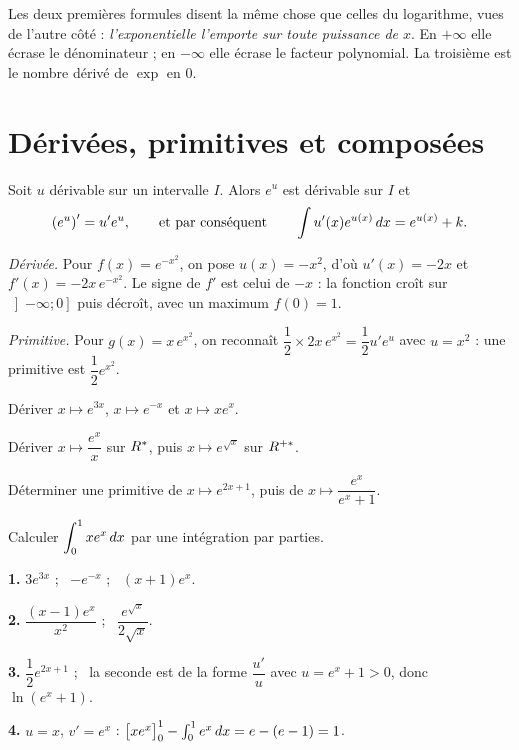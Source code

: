 \begin{remarque}
Les deux premières formules disent la même chose que celles du logarithme, vues
de l'autre côté : \emph{l'exponentielle l'emporte sur toute puissance de $x$}.
En $+\infty$ elle écrase le dénominateur ; en $-\infty$ elle écrase le facteur
polynomial. La troisième est le nombre dérivé de $\exp$ en $0$.
\end{remarque}

\section{Dérivées, primitives et composées}

\begin{theoreme}
Soit $u$ dérivable sur un intervalle $I$. Alors $e^{u}$ est dérivable sur $I$
et
\[
  \left(e^{u}\right)' = u'e^{u}, \qquad\text{et par conséquent}\qquad
  \int u'(x)e^{u(x)}\,dx = e^{u(x)} + k .
\]
\end{theoreme}

\begin{exemple}
\emph{Dérivée.} Pour $f(x) = e^{-x^{2}}$, on pose $u(x) = -x^{2}$, d'où
$u'(x) = -2x$ et $f'(x) = -2x\,e^{-x^{2}}$. Le signe de $f'$ est celui de
$-x$ : la fonction croît sur $\left]-\infty;0\right]$ puis décroît, avec un
maximum $f(0) = 1$.

\smallskip
\emph{Primitive.} Pour $g(x) = x\,e^{x^{2}}$, on reconnaît
$\dfrac{1}{2}\times 2x\,e^{x^{2}} = \dfrac{1}{2}u'e^{u}$ avec $u = x^{2}$ :
une primitive est $\dfrac{1}{2}e^{x^{2}}$.
\end{exemple}

\begin{entrainement}
\exo[\niveau{1}] Dériver $x \mapsto e^{3x}$, $x \mapsto e^{-x}$ et
$x \mapsto xe^{x}$.

\exo[\niveau{2}] Dériver $x \mapsto \dfrac{e^{x}}{x}$ sur $R^{*}$, puis
$x \mapsto e^{\sqrt{x}}$ sur $R^{+*}$.

\exo[\niveau{2}] Déterminer une primitive de $x \mapsto e^{2x+1}$, puis de
$x \mapsto \dfrac{e^{x}}{e^{x}+1}$.

\exo[\niveau{3}] Calculer $\displaystyle\int_{0}^{1} xe^{x}\,dx$ par une
intégration par parties.
\end{entrainement}

\begin{corrige}
\textbf{1.} $3e^{3x}$ ; \ $-e^{-x}$ ; \ $(x+1)e^{x}$.

\textbf{2.} $\dfrac{(x-1)e^{x}}{x^{2}}$ ; \
$\dfrac{e^{\sqrt{x}}}{2\sqrt{x}}$.

\textbf{3.} $\dfrac{1}{2}e^{2x+1}$ ; \ la seconde est de la forme
$\dfrac{u'}{u}$ avec $u = e^{x}+1>0$, donc $\ln\left(e^{x}+1\right)$.

\textbf{4.} $u=x$, $v'=e^{x}$ :
$\bigl[xe^{x}\bigr]_{0}^{1} - \int_{0}^{1}e^{x}\,dx = e - (e-1) = 1$.
\end{corrige}

